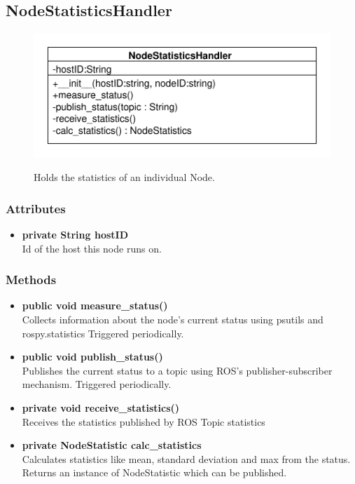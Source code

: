 \subsection{NodeStatisticsHandler}
\begin{figure}[htbp]
	\begin{minipage}[t]{7cm}
		\vspace{0pt}
		\centering
		\includegraphics[scale=0.6]{./diagram_pictures/NodeInterface/NodeStatisticsHandler.pdf}
	\end{minipage}
	\hfill
	\begin{minipage}[t]{6cm}
		\vspace{10pt}
		Holds the statistics of an individual Node.
	\end{minipage}
\end{figure}


\subsubsection{Attributes}
\begin{itemize}
	\item \textbf{private String hostID}\\
	Id of the host this node runs on.
\end{itemize}

\subsubsection{Methods}
\begin{itemize}
	\item \textbf{public void measure\_status()}\\
	Collects information about the node's current status using psutils and rospy.statistics
	Triggered periodically.
	\item \textbf{public void publish\_status()}\\
	Publishes the current status to a topic using ROS's publisher-subscriber mechanism.
	Triggered periodically.
	\item \textbf{private void receive\_statistics()}\\
	Receives the statistics published by ROS Topic statistics
	\item \textbf{private NodeStatistic calc\_statistics}\\
	Calculates statistics like mean, standard deviation and max from the status.
	Returns an instance of NodeStatistic which can be published.
\end{itemize}

